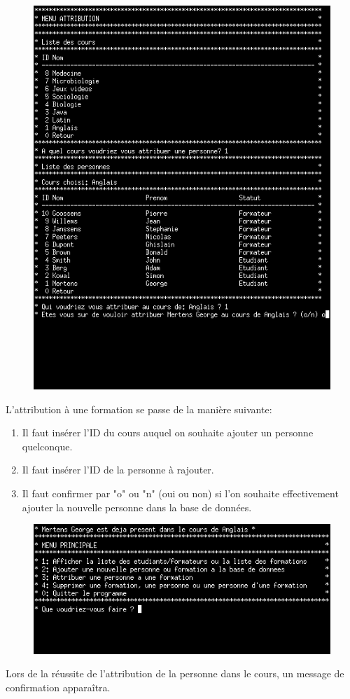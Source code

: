 \documentclass[11pt]{article}
\begin{document}
\newpage
\begin{figure}[ht]
  \centering
  \includegraphics[trim=0 110 0 0, clip, width=\textwidth]{images/14.png}
\end{figure}
L'attribution à une formation se passe de la manière suivante:
\begin{enumerate}
\item Il faut insérer l'ID du cours auquel on souhaite ajouter un personne quelconque.
\item Il faut insérer l'ID de la personne à rajouter.
\item Il faut confirmer par "o" ou "n" (oui ou non) si l'on souhaite effectivement ajouter la nouvelle personne dans la base de données.
\end{enumerate}

\newpage
\begin{figure}[ht]
  \centering
  \includegraphics[trim=0 60 0 0, clip, width=\textwidth]{images/15.png}
\end{figure}
Lors de la réussite de l'attribution de la personne dans le cours, un message de confirmation apparaîtra.
\end{document}

